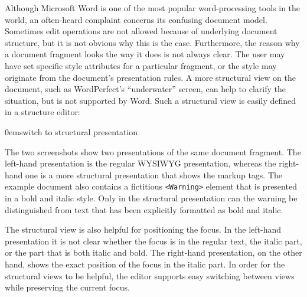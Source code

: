 \documentclass{speauth}
\begin{document}
Although Microsoft Word is one of the most popular word-processing tools in the world, an often-heard complaint concerns its confusing document model. Sometimes edit operations are not allowed because of underlying document structure, but it is not obvious why this is the case. Furthermore, the reason why a document fragment looks the way it does is not always clear. The user may have set specific style attributes for a particular fragment, or the style may originate from the document's presentation rules. A more structural view on the document, such as WordPerfect's ``underwater'' screen, can help to clarify the situation, but is not supported by Word. Such a structural view is easily defined in a structure editor:



{0em}{\small switch to structural presentation}


The two screenshots show two presentations of the same document fragment. The left-hand presentation is the regular WYSIWYG presentation, whereas the right-hand one is a more structural presentation that shows the markup tags. The example document also contains a fictitious \verb|<Warning>| element that is presented in a bold and italic style. Only in the structural presentation can the warning be distinguished from text that has been explicitly formatted as bold and italic.

The structural view is also helpful for positioning the focus. In the left-hand presentation it is not clear whether the focus is in the regular text, the italic part, or the part that is both italic and bold. The right-hand presentation, on the other hand, shows the exact position of the focus in the italic part. In order for the structural views to be helpful, the editor supports easy switching between views while preserving the current focus.
\end{document}
